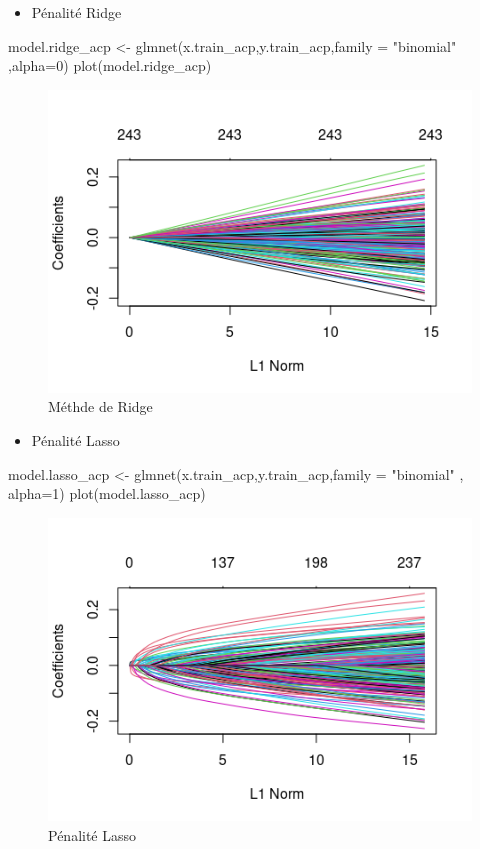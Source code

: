 \documentclass[
  12pt,
]{article}
\newenvironment{Shaded}{\begin{snugshade}}{\end{snugshade}}
\newcommand{\AttributeTok}[1]{\textcolor[rgb]{0.77,0.63,0.00}{#1}}
\newcommand{\DecValTok}[1]{\textcolor[rgb]{0.00,0.00,0.81}{#1}}
\newcommand{\FunctionTok}[1]{\textcolor[rgb]{0.00,0.00,0.00}{#1}}
\newcommand{\NormalTok}[1]{#1}
\newcommand{\OtherTok}[1]{\textcolor[rgb]{0.56,0.35,0.01}{#1}}
\newcommand{\StringTok}[1]{\textcolor[rgb]{0.31,0.60,0.02}{#1}}
\providecommand{\tightlist}{%
  \setlength{\itemsep}{0pt}\setlength{\parskip}{0pt}}
\begin{document}
\begin{itemize}
\tightlist
\item
  Pénalité Ridge
\end{itemize}

\begin{Shaded}
\begin{Highlighting}[]
\NormalTok{model.ridge\_acp }\OtherTok{\textless{}{-}} \FunctionTok{glmnet}\NormalTok{(x.train\_acp,y.train\_acp,}\AttributeTok{family =} \StringTok{"binomial"}\NormalTok{ ,}\AttributeTok{alpha=}\DecValTok{0}\NormalTok{)}
\FunctionTok{plot}\NormalTok{(model.ridge\_acp)}
\end{Highlighting}
\end{Shaded}

\begin{figure}

{\centering \includegraphics[width=0.5\linewidth]{pictures/ridge_acp} 

}

\caption{Méthde de Ridge}\label{fig:ridge_acp}
\end{figure}

\begin{itemize}
\tightlist
\item
  Pénalité Lasso
\end{itemize}

\begin{Shaded}
\begin{Highlighting}[]
\NormalTok{model.lasso\_acp }\OtherTok{\textless{}{-}} \FunctionTok{glmnet}\NormalTok{(x.train\_acp,y.train\_acp,}\AttributeTok{family =} \StringTok{"binomial"}\NormalTok{ , }\AttributeTok{alpha=}\DecValTok{1}\NormalTok{)}
\FunctionTok{plot}\NormalTok{(model.lasso\_acp)}
\end{Highlighting}
\end{Shaded}

\begin{figure}

{\centering \includegraphics[width=0.5\linewidth]{pictures/lasso_acp} 

}

\caption{Pénalité Lasso}\label{fig:lasso_acp}
\end{figure}
\end{document}
